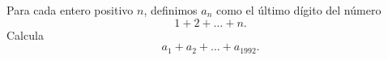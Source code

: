 Para cada entero positivo $n$, definimos $a_n$ como el último dígito del número
\[1+2+\dots+n.\]
Calcula
\[a_1+a_2+\dots+a_{1992}.\]